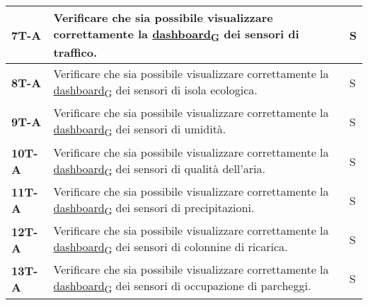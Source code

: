 \begin{longtable}{|>{\raggedright\arraybackslash}m{}|>{\raggedright\arraybackslash}m{}|>{\raggedright\arraybackslash}m{}|}
	\hline
	\textbf{7T-A}   & Verificare che sia possibile visualizzare correttamente la \href{https://7last.github.io/docs/pb/documentazione-interna/glossario\#dashboard}{dashboard\textsubscript{G}} dei sensori di traffico.                                                                                                              & S              \\
	\hline
	\textbf{8T-A}   & Verificare che sia possibile visualizzare correttamente la \href{https://7last.github.io/docs/pb/documentazione-interna/glossario\#dashboard}{dashboard\textsubscript{G}} dei sensori di isola ecologica.                                                                                                       & S              \\
	\hline
	\textbf{9T-A}   & Verificare che sia possibile visualizzare correttamente la \href{https://7last.github.io/docs/pb/documentazione-interna/glossario\#dashboard}{dashboard\textsubscript{G}} dei sensori di umidità.                                                                                                               & S              \\
	\hline
	\textbf{10T-A}  & Verificare che sia possibile visualizzare correttamente la \href{https://7last.github.io/docs/pb/documentazione-interna/glossario\#dashboard}{dashboard\textsubscript{G}} dei sensori di qualità dell'aria.                                                                                                     & S              \\
	\hline
	\textbf{11T-A}  & Verificare che sia possibile visualizzare correttamente la \href{https://7last.github.io/docs/pb/documentazione-interna/glossario\#dashboard}{dashboard\textsubscript{G}} dei sensori di precipitazioni.                                                                                                        & S              \\
	\hline
	\textbf{12T-A}  & Verificare che sia possibile visualizzare correttamente la \href{https://7last.github.io/docs/pb/documentazione-interna/glossario\#dashboard}{dashboard\textsubscript{G}} dei sensori di colonnine di ricarica.                                                                                                 & S              \\
	\hline
	\textbf{13T-A}  & Verificare che sia possibile visualizzare correttamente la \href{https://7last.github.io/docs/pb/documentazione-interna/glossario\#dashboard}{dashboard\textsubscript{G}} dei sensori di occupazione di parcheggi.                                                                                              & S              \\

\end{longtable}
